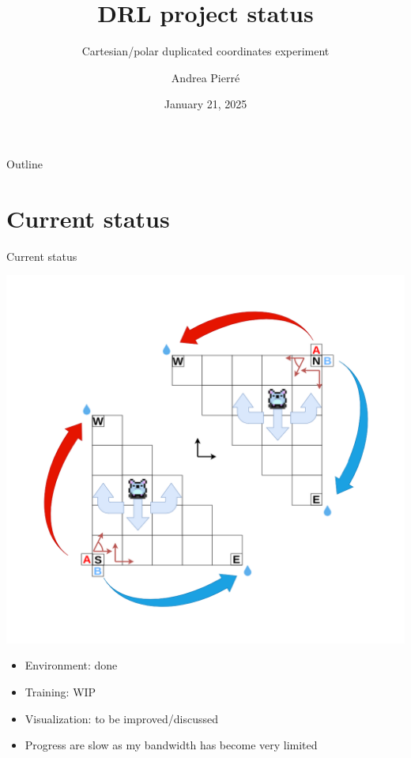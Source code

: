 \documentclass[bigger]{beamer}
\author{Andrea Pierré}
\date{January 21, 2025}
\title{DRL project status}
\subtitle{Cartesian/polar duplicated coordinates experiment}
\begin{document}
\maketitle
\begin{frame}[plain]{Outline}
\tableofcontents
\end{frame}

\section{Current status}
\label{sec:org49e7e10}
\begin{frame}[label={sec:org3500662}]{Current status}
\begin{center}
\includegraphics[height=0.5\textheight]{img/RL_env-cartesian-polar.drawio.png}
\end{center}
\begin{itemize}
\item Environment: done
\item Training: WIP
\item Visualization: to be improved/discussed
\item Progress are slow as my bandwidth has become very limited
\end{itemize}
\end{frame}
\end{document}
